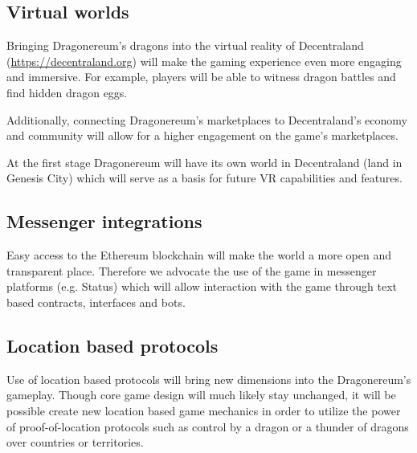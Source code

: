 \documentclass[12pt]{article}
\begin{document}
 \subsection{Virtual worlds}\label{Virtual worlds} \par

Bringing Dragonereum’s dragons into the virtual reality of Decentraland (\url{https://decentraland.org}) will make the gaming experience even more engaging and immersive. For example, players will be able to witness dragon battles and find hidden dragon eggs. \par

Additionally, connecting Dragonereum’s marketplaces to Decentraland’s economy and community will allow for a higher engagement on the game’s marketplaces.\par

At the first stage Dragonereum will have its own world in Decentraland (land in Genesis City) which will serve as a basis for future VR capabilities and features.\par


\vspace{\baselineskip}
 \subsection{Messenger integrations}\label{Messenger integrations} \par

Easy access to the Ethereum blockchain will make the world a more open and transparent place. Therefore we advocate the use of the game in messenger platforms (e.g. Status) which will allow interaction with the game through text based contracts, interfaces and bots.\par


\vspace{\baselineskip}
 \subsection{Location based protocols}\label{Location based protocols} \par

Use of location based protocols will bring new dimensions into the Dragonereum’s gameplay. Though core game design will much likely stay unchanged, it will be possible create new location based game mechanics in order to utilize the power of proof-of-location protocols such as control by a dragon or a thunder of dragons over countries or territories.\\
\end{document}
